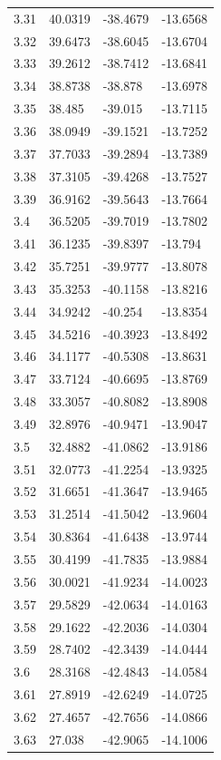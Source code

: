 \begin{tabular}{llll}
3.31 & 40.0319 & -38.4679 & -13.6568 \\
3.32 & 39.6473 & -38.6045 & -13.6704 \\
3.33 & 39.2612 & -38.7412 & -13.6841 \\
3.34 & 38.8738 & -38.878 & -13.6978 \\
3.35 & 38.485 & -39.015 & -13.7115 \\
3.36 & 38.0949 & -39.1521 & -13.7252 \\
3.37 & 37.7033 & -39.2894 & -13.7389 \\
3.38 & 37.3105 & -39.4268 & -13.7527 \\
3.39 & 36.9162 & -39.5643 & -13.7664 \\
3.4 & 36.5205 & -39.7019 & -13.7802 \\
3.41 & 36.1235 & -39.8397 & -13.794 \\
3.42 & 35.7251 & -39.9777 & -13.8078 \\
3.43 & 35.3253 & -40.1158 & -13.8216 \\
3.44 & 34.9242 & -40.254 & -13.8354 \\
3.45 & 34.5216 & -40.3923 & -13.8492 \\
3.46 & 34.1177 & -40.5308 & -13.8631 \\
3.47 & 33.7124 & -40.6695 & -13.8769 \\
3.48 & 33.3057 & -40.8082 & -13.8908 \\
3.49 & 32.8976 & -40.9471 & -13.9047 \\
3.5 & 32.4882 & -41.0862 & -13.9186 \\
3.51 & 32.0773 & -41.2254 & -13.9325 \\
3.52 & 31.6651 & -41.3647 & -13.9465 \\
3.53 & 31.2514 & -41.5042 & -13.9604 \\
3.54 & 30.8364 & -41.6438 & -13.9744 \\
3.55 & 30.4199 & -41.7835 & -13.9884 \\
3.56 & 30.0021 & -41.9234 & -14.0023 \\
3.57 & 29.5829 & -42.0634 & -14.0163 \\
3.58 & 29.1622 & -42.2036 & -14.0304 \\
3.59 & 28.7402 & -42.3439 & -14.0444 \\
3.6 & 28.3168 & -42.4843 & -14.0584 \\
3.61 & 27.8919 & -42.6249 & -14.0725 \\
3.62 & 27.4657 & -42.7656 & -14.0866 \\
3.63 & 27.038 & -42.9065 & -14.1006 \\

\end{tabular}
